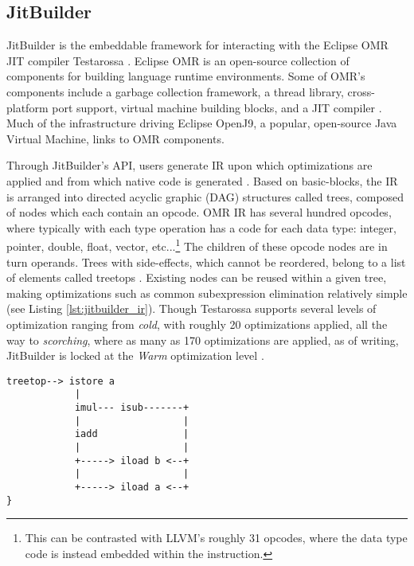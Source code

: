 \subsection{JitBuilder}
\label{sec:jitbuilder}
JitBuilder is the embeddable framework for interacting with the Eclipse OMR JIT compiler Testarossa \cite{jitbuilderPaper}.
Eclipse OMR is an open-source collection of components for building language runtime environments.
Some of OMR's components include a garbage collection framework, a thread library, cross-platform port support, virtual machine building blocks, and a JIT compiler \cite{eclipseOMR,RebuildingAirliner}.
Much of the infrastructure driving Eclipse OpenJ9, a popular, open-source Java Virtual Machine, links to OMR components.

Through JitBuilder's API, users generate IR upon which optimizations are applied and from which native code is generated \cite{SuganumaIBMJit}.
Based on basic-blocks, the IR is arranged into directed acyclic graphic (DAG) structures called trees, composed of nodes which each contain an opcode.
OMR IR has several hundred opcodes, where typically with each type operation has a code for each data type: integer, pointer, double, float, vector, etc...\footnote{
    This can be contrasted with LLVM's roughly 31 opcodes, where the data type code is instead embedded within the instruction.
}
The children of these opcode nodes are in turn operands.
Trees with side-effects, which cannot be reordered, belong to a list of elements called treetops \cite{treetops}.
Existing nodes can be reused within a given tree, making optimizations such as common subexpression elimination relatively simple (see Listing \ref{lst:jitbuilder_ir}).
Though Testarossa supports several levels of optimization ranging from \textit{cold}, with roughly 20 optimizations applied, all the way to \textit{scorching}, where as many as 170 optimizations are applied, as of writing, JitBuilder is locked at the \textit{Warm} optimization level \cite{sanchez2011using, jitbuilderWarm}.
\begin{lstlisting}[float,floatplacement=H,
caption={OMR IR representation for (a+b)*(a-b). Note that the iload nodes are reused \cite{treetops}.},
label=lst:jitbuilder_ir]
treetop--> istore a
            |
            imul--- isub-------+
            |                  |
            iadd               |
            |                  |
            +-----> iload b <--+
            |                  |
            +-----> iload a <--+
}\end{lstlisting}

